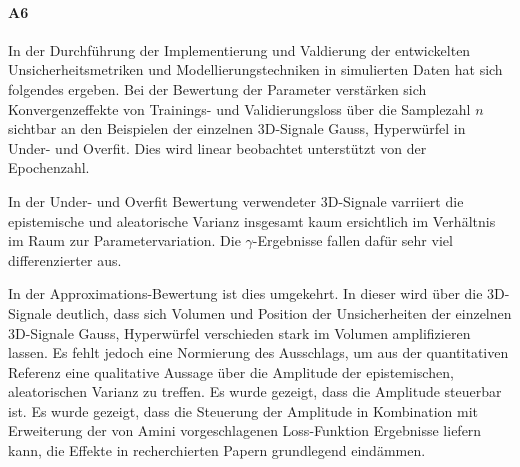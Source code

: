\paragraph{A6} In der Durchführung der Implementierung und Valdierung der entwickelten Unsicherheitsmetriken und Modellierungstechniken in simulierten Daten hat sich folgendes ergeben. Bei der Bewertung der Parameter verstärken sich Konvergenzeffekte von Trainings- und Validierungsloss über die Samplezahl $n$ sichtbar an den Beispielen der einzelnen 3D-Signale Gauss, Hyperwürfel in Under- und Overfit. Dies wird linear beobachtet unterstützt von der Epochenzahl. 


In der Under- und Overfit Bewertung verwendeter 3D-Signale varriiert die epistemische und aleatorische Varianz insgesamt kaum ersichtlich im Verhältnis im Raum zur Parametervariation. Die $\gamma$-Ergebnisse fallen dafür sehr viel differenzierter aus. 

In der Approximations-Bewertung ist dies umgekehrt. In dieser wird über die 3D-Signale deutlich, dass sich Volumen und Position der Unsicherheiten der einzelnen 3D-Signale Gauss, Hyperwürfel verschieden stark im Volumen amplifizieren lassen. Es fehlt jedoch eine Normierung des Ausschlags, um aus der quantitativen Referenz eine qualitative Aussage über die Amplitude der epistemischen, aleatorischen Varianz zu treffen. Es wurde gezeigt, dass die Amplitude steuerbar ist. Es wurde gezeigt, dass die Steuerung der Amplitude in Kombination mit Erweiterung der von Amini vorgeschlagenen  Loss-Funktion Ergebnisse liefern kann, die Effekte in recherchierten Papern grundlegend eindämmen.